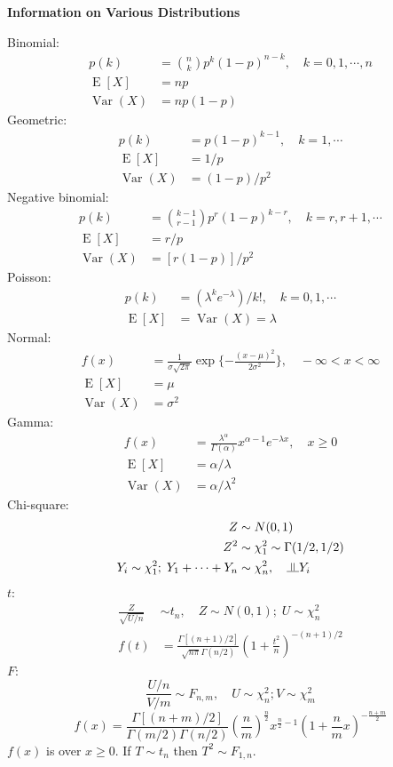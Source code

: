 \documentclass[a4paper]{article}
\newcommand{\subheading}[1]{{\scriptsize\textbf{#1}}}
\renewenvironment{section}[1]
  {
    \subheading{#1}

  }{
    \smallskip
  }
\newcommand{\independent}{\raisebox{0.05em}{\rotatebox[origin=c]{90}{$\models$}}}
\newcommand{\expectation}[1]{\operatorname{E}[#1]}
\DeclareMathOperator{\Var}{Var}
\begin{document}
\begin{multicols*}{4}
\begin{section}{Information on Various Distributions}
  Binomial:
  \begin{align*}
    p(k) &= \binom{n}{k} p^k (1-p)^{n-k}, \quad k=0,1,\cdots,n \\
    \expectation{X} &= np \\
    \Var(X) &= np(1-p)
  \end{align*}
  Geometric:
  \begin{align*}
    p(k) &= p(1-p)^{k-1}, \quad k=1,\cdots \\
    \expectation{X} &= 1/p \\
    \Var(X) &= (1-p)/p^2
  \end{align*}
  Negative binomial:
  \begin{align*}
    p(k) &= \binom{k-1}{r-1} p^r (1-p)^{k-r}, \quad k=r,r+1,\cdots \\
    \expectation{X} &= r/p \\
    \Var(X) &= [r(1-p)]/p^2
  \end{align*}
  Poisson:
  \begin{align*}
    p(k) &= (\lambda^k e^{-\lambda})/k!, \quad k=0,1,\cdots \\
    \expectation{X} &= \Var(X) = \lambda
  \end{align*}
  Normal:
  \begin{align*}
    f(x) &= \frac{1}{\sigma\sqrt{2\pi}}\exp\{-\frac{(x-\mu)^2}{2\sigma^2}\},
      \quad -\infty < x < \infty \\
    \expectation{X} &= \mu \\
    \Var(X) &= \sigma^2
  \end{align*}
  Gamma:
  \begin{align*}
    f(x) &= \frac{\lambda^\alpha}{\Gamma(\alpha)} x^{\alpha-1} e^{-\lambda x},
      \quad x \geq 0 \\
    \expectation{X} &= \alpha / \lambda \\
    \Var(X) &= \alpha / \lambda^2
  \end{align*}
  Chi-square:
  \begin{align*}
    Z &\sim N(0, 1) \\
    Z^2 &\sim \chi^2_1 \sim \Gamma(1/2, 1/2) \\
    Y_i \sim \chi^2_1;\; Y_1 + \cdots + Y_n &\sim \chi^2_n, \quad \independent Y_i
  \end{align*}
  $t$:
  \begin{align*}
    \frac{Z}{\sqrt{U/n}} &\sim t_n, \quad Z \sim N(0, 1);\; U \sim \chi^2_n \\
    f(t) &= \frac{\Gamma[(n+1)/2]}{\sqrt{n\pi}\Gamma(n/2)}
      \left ( 1 + \frac{t^2}{n} \right )^{-(n+1)/2}
  \end{align*}
  $F$:
  $$\frac{U/n}{V/m} \sim F_{n, m}, \quad U \sim \chi^2_n; V \sim \chi^2_m$$
  {\tiny
  $$f(x) = \frac{\Gamma[(n+m)/2]}{\Gamma(m/2)\Gamma(n/2)}
    \left ( \frac{n}{m} \right )^{\frac{n}{2}}
    x^{\frac{n}{2}-1}
    \left (1 + \frac{n}{m}x \right )^{-\frac{n+m}{2}}$$
  }
  $f(x)$ is over $x \geq 0$. If $T \sim t_n$ then $T^2 \sim F_{1, n}$.


\end{section}
\end{multicols*}
\end{document}
